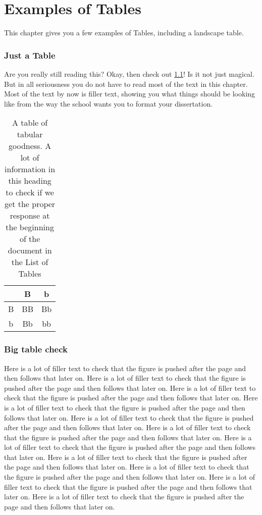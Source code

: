 \chapter{Examples of Tables}
This chapter gives you a few examples of Tables, including a landscape table.

\subsection{Just a Table}
Are you really still reading this? Okay, then check out \ref{tab:magic}! Is it not just magical. But in all seriousness you do not have to read most of the text in this chapter. Most of the text by now is filler text, showing you what things should be looking like from the way the school wants you to format your dissertation. 

\begin{table}
	\caption{\label{tab:magic} A table of tabular goodness. A lot of information in this heading to check if we get the proper response at the beginning of the document in the List of Tables}
	\begin{center}
		\begin{tabular}{|c|c|c|}
			\hline
			& B & b \\
			\hline
			B & BB & Bb \\
			\hline
			b & Bb & bb \\
			\hline
		\end{tabular}
	\end{center}
\end{table}


\subsection{Big table check}
Here is a lot of filler text to check that the figure is pushed after the page and then follows that later on. Here is a lot of filler text to check that the figure is pushed after the page and then follows that later on. Here is a lot of filler text to check that the figure is pushed after the page and then follows that later on. Here is a lot of filler text to check that the figure is pushed after the page and then follows that later on. Here is a lot of filler text to check that the figure is pushed after the page and then follows that later on. Here is a lot of filler text to check that the figure is pushed after the page and then follows that later on. Here is a lot of filler text to check that the figure is pushed after the page and then follows that later on. Here is a lot of filler text to check that the figure is pushed after the page and then follows that later on. Here is a lot of filler text to check that the figure is pushed after the page and then follows that later on. Here is a lot of filler text to check that the figure is pushed after the page and then follows that later on. Here is a lot of filler text to check that the figure is pushed after the page and then follows that later on. 

